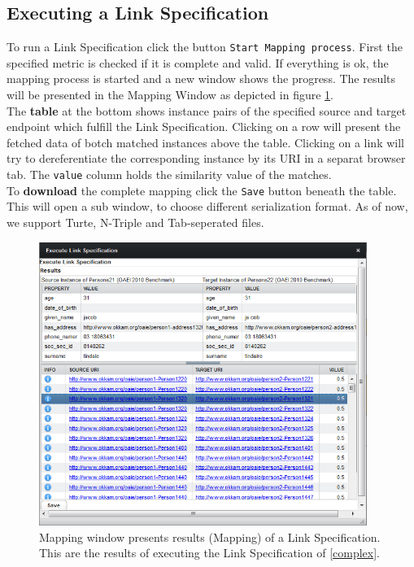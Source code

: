 \documentclass[oneside,a4paper,12pt]{memoir}
\begin{document}
\subsection{Executing a Link Specification}
To run a Link Specification click the button \texttt{Start Mapping process}. First the specified metric is checked if it is complete and valid. If everything is ok, the mapping process is started and a new window shows the progress. The results will be presented in the Mapping Window as depicted in figure \ref{fig:execution}.\\
 The \textbf{table} at the bottom shows instance pairs of the specified source and target endpoint which fulfill the Link Specification. Clicking on a row will present the fetched data of botch matched instances above the table. Clicking on a link will try to dereferentiate the corresponding instance by its URI in a separat browser tab. The \texttt{value} column holds the similarity value of the matches.\\To \textbf{download} the complete mapping click the \texttt{Save} button beneath the table. This will open a sub window, to choose different serialization format. As of now, we support Turte, N-Triple and Tab-seperated files.
 
 \begin{figure}[!h]
		\centering
		\includegraphics[width=0.95\textwidth]{images/execution_window.png}
		\caption{Mapping window presents results (Mapping) of a Link Specification. This are the results of executing the Link Specification of \ref{complex}.}
		\label{fig:execution}
	\end{figure}
\end{document}
